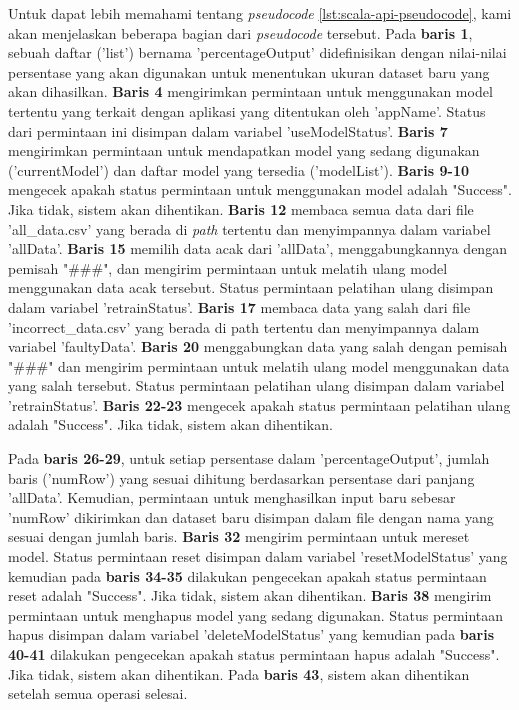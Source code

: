

Untuk dapat lebih memahami tentang \emph{pseudocode} 
\ref{lst:scala-api-pseudocode}, kami akan menjelaskan
beberapa bagian dari \emph{pseudocode} tersebut.
Pada \textbf{baris 1}, sebuah daftar ('list') bernama 
'percentageOutput' didefinisikan dengan nilai-nilai 
persentase yang akan digunakan untuk menentukan ukuran 
dataset baru yang akan dihasilkan. \textbf{Baris 4} mengirimkan 
permintaan untuk menggunakan model tertentu yang terkait 
dengan aplikasi yang ditentukan oleh 'appName'. 
Status dari permintaan ini disimpan dalam variabel 
'useModelStatus'. \textbf{Baris 7} mengirimkan permintaan 
untuk mendapatkan model yang sedang digunakan 
('currentModel') dan daftar model yang tersedia 
('modelList'). \textbf{Baris 9-10} mengecek apakah status 
permintaan untuk menggunakan model adalah "Success". 
Jika tidak, sistem akan dihentikan. \textbf{Baris 12} membaca 
semua data dari file 'all\_data.csv' yang berada di 
\emph{path} tertentu dan menyimpannya dalam variabel 
'allData'. \textbf{Baris 15} memilih data acak dari 'allData', 
menggabungkannya dengan pemisah "\#\#\#", dan mengirim 
permintaan untuk melatih ulang model menggunakan data 
acak tersebut. Status permintaan pelatihan ulang 
disimpan dalam variabel 'retrainStatus'. \textbf{Baris 17} 
membaca data yang salah dari file 'incorrect\_data.csv' 
yang berada di path tertentu dan menyimpannya dalam 
variabel 'faultyData'. \textbf{Baris 20} menggabungkan data 
yang salah dengan pemisah "\#\#\#" dan mengirim 
permintaan untuk melatih ulang model menggunakan 
data yang salah tersebut. Status permintaan 
pelatihan ulang disimpan dalam variabel 'retrainStatus'.
\textbf{Baris 22-23} mengecek apakah status permintaan pelatihan 
ulang adalah "Success". Jika tidak, sistem akan dihentikan.

Pada \textbf{baris 26-29}, untuk setiap persentase dalam 
'percentageOutput', jumlah baris ('numRow') yang 
sesuai dihitung berdasarkan persentase dari panjang 'allData'. 
Kemudian, permintaan untuk menghasilkan input baru 
sebesar 'numRow' dikirimkan dan dataset baru disimpan 
dalam file dengan nama yang sesuai dengan jumlah baris.
\textbf{Baris 32} mengirim permintaan untuk mereset model. 
Status permintaan reset disimpan dalam variabel 
'resetModelStatus' yang kemudian pada \textbf{baris 34-35}
dilakukan pengecekan apakah status permintaan 
reset adalah "Success". Jika tidak, sistem akan dihentikan.
\textbf{Baris 38} mengirim permintaan untuk menghapus model
yang sedang digunakan. Status permintaan hapus
disimpan dalam variabel 'deleteModelStatus' yang
kemudian pada \textbf{baris 40-41} dilakukan pengecekan apakah
status permintaan hapus adalah "Success". Jika tidak,
sistem akan dihentikan. Pada \textbf{baris 43}, sistem akan
dihentikan setelah semua operasi selesai.



